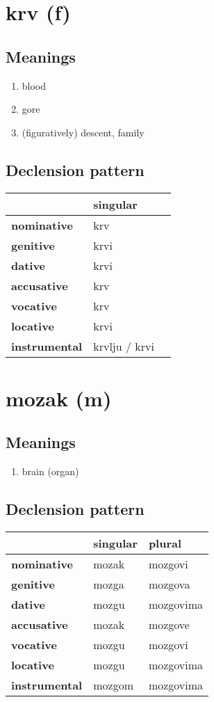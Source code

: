 \filbreak
\section{krv (f)}
\subsection*{Meanings}
\begin{enumerate}
\item blood
\item gore
\item (figuratively) descent, family
\end{enumerate}
\subsection*{Declension pattern}
\begin{tabularx}{\linewidth}{Xll}
\toprule
{} &       singular \\
\midrule
\textbf{nominative  } &            krv \\
\textbf{genitive    } &           krvi \\
\textbf{dative      } &           krvi \\
\textbf{accusative  } &            krv \\
\textbf{vocative    } &            krv \\
\textbf{locative    } &           krvi \\
\textbf{instrumental} &  krvlju / krvi \\
\bottomrule
\end{tabularx}

\filbreak
\section{mozak (m)}
\subsection*{Meanings}
\begin{enumerate}
\item brain (organ)
\end{enumerate}
\subsection*{Declension pattern}
\begin{tabularx}{\linewidth}{Xll}
\toprule
{} & singular &     plural \\
\midrule
\textbf{nominative  } &    mozak &    mozgovi \\
\textbf{genitive    } &    mozga &    mozgova \\
\textbf{dative      } &    mozgu &  mozgovima \\
\textbf{accusative  } &    mozak &    mozgove \\
\textbf{vocative    } &    mozgu &    mozgovi \\
\textbf{locative    } &    mozgu &  mozgovima \\
\textbf{instrumental} &   mozgom &  mozgovima \\
\bottomrule
\end{tabularx}


